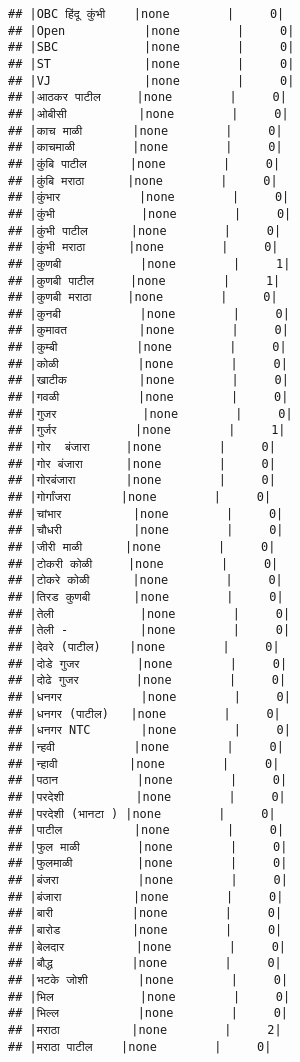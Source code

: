 \documentclass[
]{article}
\begin{document}
\begin{verbatim}
## |OBC हिंदू कुंभी    |none        |     0|
## |Open           |none        |     0|
## |SBC            |none        |     0|
## |ST             |none        |     0|
## |VJ             |none        |     0|
## |आठकर पाटील     |none        |     0|
## |ओबीसी          |none        |     0|
## |काच माळी       |none        |     0|
## |काचमाळी        |none        |     0|
## |कुंबि पाटील      |none        |     0|
## |कुंबि मराठा      |none        |     0|
## |कुंभार           |none        |     0|
## |कुंभी            |none        |     0|
## |कुंभी पाटील      |none        |     0|
## |कुंभी मराठा      |none        |     0|
## |कुणबी           |none        |     1|
## |कुणबी पाटील     |none        |     1|
## |कुणबी मराठा     |none        |     0|
## |कुनबी           |none        |     0|
## |कुमावत          |none        |     0|
## |कुम्बी           |none        |     0|
## |कोळी           |none        |     0|
## |खाटीक          |none        |     0|
## |गवळी           |none        |     0|
## |गुजर            |none        |     0|
## |गुर्जर           |none        |     1|
## |गोर  बंजारा     |none        |     0|
## |गोर बंजारा      |none        |     0|
## |गोरबंजारा       |none        |     0|
## |गोर्गांजरा       |none        |     0|
## |चांभार          |none        |     0|
## |चौधरी          |none        |     0|
## |जीरी माळी      |none        |     0|
## |टोकरी कोळी     |none        |     0|
## |टोकरे कोळी      |none        |     0|
## |तिरड कुणबी      |none        |     0|
## |तेली            |none        |     0|
## |तेली -          |none        |     0|
## |देवरे (पाटील)    |none        |     0|
## |दोडे गुजर        |none        |     0|
## |दोढे गुजर        |none        |     0|
## |धनगर           |none        |     0|
## |धनगर (पाटील)   |none        |     0|
## |धनगर NTC       |none        |     0|
## |न्हवी           |none        |     0|
## |न्हावी          |none        |     0|
## |पठान           |none        |     0|
## |परदेशी          |none        |     0|
## |परदेशी (भानटा ) |none        |     0|
## |पाटील          |none        |     0|
## |फुल माळी        |none        |     0|
## |फुलमाळी         |none        |     0|
## |बंजरा           |none        |     0|
## |बंजारा          |none        |     0|
## |बारी           |none        |     0|
## |बारोड          |none        |     0|
## |बेलदार          |none        |     0|
## |बौद्ध           |none        |     0|
## |भटके जोशी       |none        |     0|
## |भिल            |none        |     0|
## |भिल्ल           |none        |     0|
## |मराठा          |none        |     2|
## |मराठा पाटील    |none        |     0|

\end{verbatim}
\end{document}
